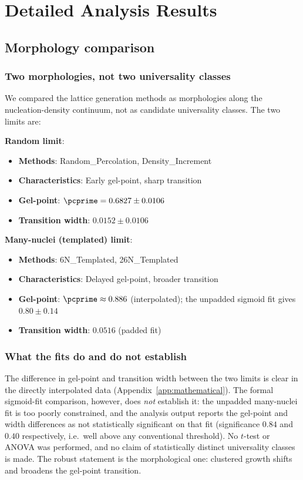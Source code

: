 \section{Detailed Analysis Results}
\label{app:detailed}

\subsection{Morphology comparison}

\subsubsection{Two morphologies, not two universality classes}
We compared the lattice generation methods as morphologies along the nucleation-density continuum, not as candidate universality classes. The two limits are:

\textbf{Random limit}:
\begin{itemize}
    \item \textbf{Methods}: Random\_Percolation, Density\_Increment
    \item \textbf{Characteristics}: Early gel-point, sharp transition
    \item \textbf{Gel-point}: $\pcprime = 0.6827 \pm 0.0106$
    \item \textbf{Transition width}: $0.0152 \pm 0.0106$
\end{itemize}

\textbf{Many-nuclei (templated) limit}:
\begin{itemize}
    \item \textbf{Methods}: 6N\_Templated, 26N\_Templated
    \item \textbf{Characteristics}: Delayed gel-point, broader transition
    \item \textbf{Gel-point}: $\pcprime \approx 0.886$ (interpolated); the unpadded sigmoid fit gives $0.80 \pm 0.14$
    \item \textbf{Transition width}: $0.0516$ (padded fit)
\end{itemize}

\subsubsection{What the fits do and do not establish}
The difference in gel-point and transition width between the two limits is clear in the directly interpolated data (Appendix~\ref{app:mathematical}). The formal sigmoid-fit comparison, however, does \emph{not} establish it: the unpadded many-nuclei fit is too poorly constrained, and the analysis output reports the gel-point and width differences as not statistically significant on that fit (significance $0.84$ and $0.40$ respectively, i.e.\ well above any conventional threshold). No $t$-test or ANOVA was performed, and no claim of statistically distinct universality classes is made. The robust statement is the morphological one: clustered growth shifts and broadens the gel-point transition.

